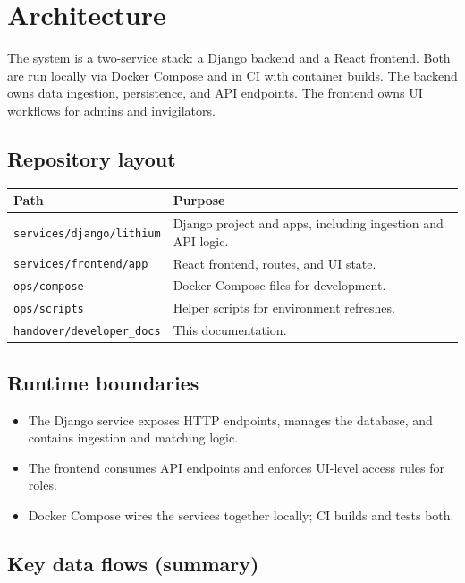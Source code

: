 \section{Architecture}
\label{sec:architecture}

The system is a two-service stack: a Django backend and a React frontend. Both are run locally via Docker Compose and in CI with container builds. The backend owns data ingestion, persistence, and API endpoints. The frontend owns UI workflows for admins and invigilators.

\subsection{Repository layout}
\label{subsec:architecture:layout}

\begin{longtable}{p{}p{}}
\toprule
\textbf{Path} & \textbf{Purpose} \\
\midrule
\texttt{services/django/lithium} & Django project and apps, including ingestion and API logic. \\
\texttt{services/frontend/app} & React frontend, routes, and UI state. \\
\texttt{ops/compose} & Docker Compose files for development. \\
\texttt{ops/scripts} & Helper scripts for environment refreshes. \\
\texttt{handover/developer\_docs} & This documentation. \\
\bottomrule
\end{longtable}

\subsection{Runtime boundaries}
\label{subsec:architecture:boundaries}

\begin{itemize}
  \item The Django service exposes HTTP endpoints, manages the database, and contains ingestion and matching logic.
  \item The frontend consumes API endpoints and enforces UI-level access rules for roles.
  \item Docker Compose wires the services together locally; CI builds and tests both.
\end{itemize}

\subsection{Key data flows (summary)}
\label{subsec:architecture:dataflows}

